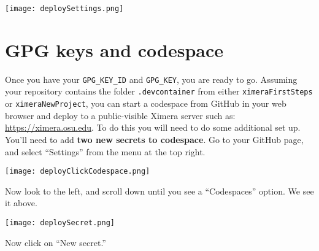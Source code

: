 \documentclass{ximera}
\begin{document}
\begin{image}
    \texttt{[image: deploySettings.png]}
\end{image}
        \section{GPG keys and codespace}
        Once you have your \verb!GPG_KEY_ID! and \verb!GPG_KEY!, you are ready
        to go.
        Assuming your repository contains the folder \verb!.devcontainer! from
        either
        \verb!ximeraFirstSteps! or \verb!ximeraNewProject!, you can
        start a codespace from GitHub in your web browser and deploy to a
        public-visible
        Ximera server such as: \url{https://ximera.osu.edu}.
        To do this you will need to do some additional set up. You'll need to
        add
        \textbf{two
            new
            secrets to codespace}. Go to your GitHub page, and select
        ``Settings''
        from the
        menu at the top right.

        \pdfOnly{\end{multicols}}

\begin{image}
    \texttt{[image: deployClickCodespace.png]}
\end{image}

Now look to the left, and scroll down until you see a ``Codespaces'' option.
We see it above.

\newpage

\begin{image}
    \texttt{[image: deploySecret.png]}
\end{image}

Now click on ``New secret.''

\newpage
\end{document}
